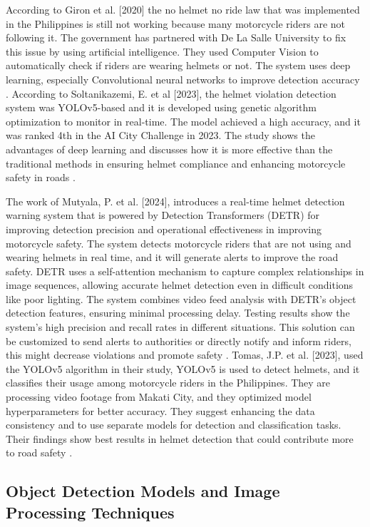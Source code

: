 \begin{refsection}
    According to Giron et al. [2020] the no helmet no ride law that was implemented in the Philippines is still not working because many motorcycle riders are not following it. The government has partnered with De La Salle University to fix this issue by using artificial intelligence. They used Computer Vision to automatically check if riders are wearing helmets or not. The system uses deep learning, especially Convolutional neural networks to improve detection accuracy \cite{giron2020motorcycle}. According to Soltanikazemi, E.  et al [2023], the helmet violation detection system was YOLOv5-based and it is developed using genetic algorithm optimization to monitor in real-time. The model achieved a high accuracy, and it was ranked 4th in the AI City Challenge in 2023. The study shows the advantages of deep learning and discusses how it is more effective than the traditional methods in ensuring helmet compliance and enhancing motorcycle safety in roads \cite{soltanikazemi2023helmet}. 

    The work of Mutyala, P. et al. [2024], introduces a real-time helmet detection warning system that is powered by Detection Transformers (DETR) for improving detection precision and operational effectiveness in improving motorcycle safety. The system detects motorcycle riders that are not using and wearing helmets in real time, and it will generate alerts to improve the road safety. DETR uses a self-attention mechanism to capture complex relationships in image sequences, allowing accurate helmet detection even in difficult conditions like poor lighting. The system combines video feed analysis with DETR's object detection features, ensuring minimal processing delay. Testing results show the system's high precision and recall rates in different situations. This solution can be customized to send alerts to authorities or directly notify and inform riders, this might decrease violations and promote safety \cite{mutyala2023helmet}.  Tomas, J.P. et al. [2023], used the YOLOv5 algorithm in their study, YOLOv5 is used to detect helmets, and it classifies their usage among motorcycle riders in the Philippines. They are processing video footage from Makati City, and they optimized model hyperparameters for better accuracy. They suggest enhancing the data consistency and to use separate models for detection and classification tasks. Their findings show best results in helmet detection that could contribute more to road safety \cite{tomas2023motorcycle}. 

\subsection{Object Detection Models and Image Processing Techniques}


\end{refsection}
